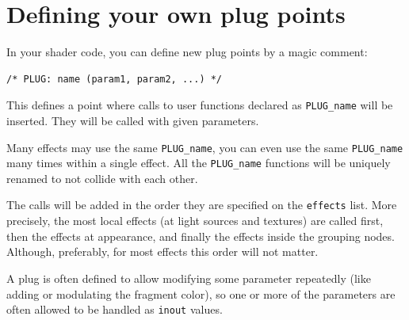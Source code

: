 \documentclass{egpubl}
\newenvironment{mycode}
{\begin{mycodecore}}
{\end{mycodecore}
\vspace{-0.1in}}
\begin{document}


\section{Defining your own plug points}

In your shader code, you can define new plug points by a
magic comment:

\begin{mycode}
\begin{Verbatim}[commandchars=\\\{\}]
/* PLUG: name (param1, param2, ...) */
\end{Verbatim}
\end{mycode}

This defines a point where calls to user functions declared as
\texttt{PLUG\_name} will be inserted. They will be called with given
parameters.

Many effects may use the same \texttt{PLUG\_name},
you can even use the same \texttt{PLUG\_name} many times within a single
effect. All the \texttt{PLUG\_name} functions
will be uniquely renamed to not collide with each other.

The calls will be added in the order they are specified on the
\texttt{effects} list. More precisely, the most local effects
(at light sources and textures) are called first, then the effects
at appearance, and finally the effects inside the grouping nodes.
Although, preferably, for most effects this order will not matter.

A plug is often defined to allow modifying some parameter
repeatedly (like adding or modulating the fragment color),
so one or more of the parameters are often allowed to be handled
as \texttt{inout} values.
\end{document}
